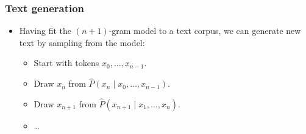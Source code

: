 \documentclass{beamer}
\begin{document}
    \begin{frame}
        \frametitle{Text generation}

        \begin{itemize}
            \setlength\itemsep{1em}
            \item Having fit the $(n+1)$-gram model to a text corpus,
            we can generate new text by sampling from the model:
            \bigskip
            \begin{itemize}
            \setlength\itemsep{1em}
            \item Start with tokens $x_0,\ldots,x_{n-1}$.
            
            \item Draw $x_n$ from $\widehat{P}(x_n\mid x_0,\ldots,x_{n-1})$.
            \item Draw $x_{n+1}$ from $\widehat{P}(x_{n+1}\mid x_1,\ldots,x_n)$.
            \item \ldots
        \end{itemize}
    \end{itemize}
    \end{frame}
\end{document}
